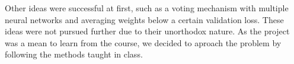 \documentclass[11pt]{article}
\begin{document}
\begin{multicols}{2}
      Other ideas were successful at first, such as a voting mechanism with
      multiple neural networks and averaging weights below a certain validation
      loss. These ideas were not pursued further due to their unorthodox
      nature.
      As the project was a mean to learn from the course, we decided to aproach
      the problem by following the methods taught in class.





\end{multicols}
\end{document}
